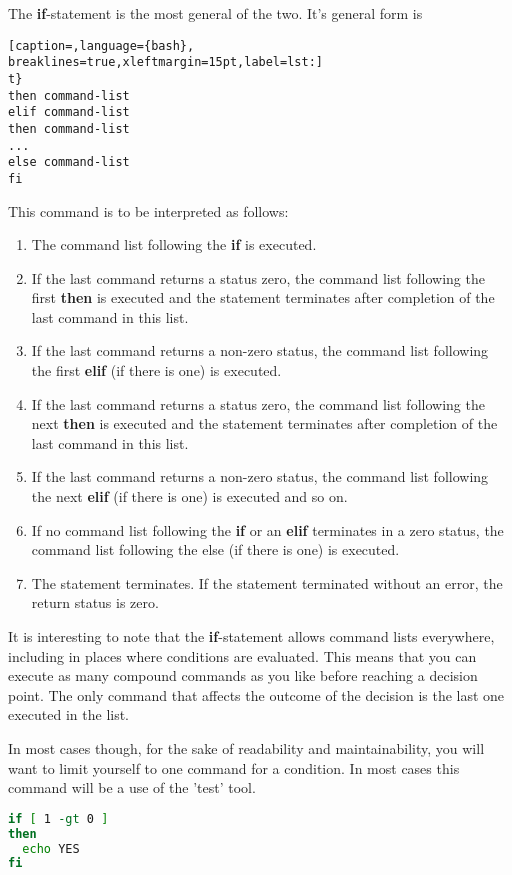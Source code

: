 The \textbf{if}-statement is the most general of the two. It's general form is
\lstset{basicstyle=\scriptsize, numbers=left, captionpos=b, tabsize=4}
\begin{lstlisting}[caption=,language={bash},
breaklines=true,xleftmargin=15pt,label=lst:]
t}
then command-list
elif command-list
then command-list
...
else command-list
fi
\end{lstlisting}

This command is to be interpreted as follows:

\begin{enumerate}
\setlength{\leftmargin}{0pt}
\setlength{\itemsep}{0pt}
\setlength{\parsep}{0pt}
\setlength{\parskip}{0pt}
	\item The command list following the \textbf{if} is executed.
	\item If the last command returns a status zero, the command list following
the first \textbf{then} is executed and the statement terminates after
completion of the last command in this list.
	\item If the last command returns a non-zero status, the command list
following the first \textbf{elif} (if there is one) is executed.
	\item If the last command returns a status zero, the command list following
the next \textbf{then} is executed and the statement terminates after
completion of the last command in this list.
	\item If the last command returns a non-zero status, the command list
following the next \textbf{elif} (if there is one) is executed and so on.
	\item If no command list following the \textbf{if} or an \textbf{elif}
terminates in a zero status, the command list following the else (if there is
one) is executed.
	\item The statement terminates. If the statement terminated without an
error, the return status is zero.
\end{enumerate}

It is interesting to note that the \textbf{if}-statement allows command lists
everywhere, including in places where conditions are evaluated. This means that
you can execute as many compound commands as you like before reaching a
decision point. The only command that affects the outcome of the decision is
the last one executed in the list.

In most cases though, for the sake of readability and maintainability, you will
want to limit yourself to one command for a condition. In most cases this
command will be a use of the 'test' tool.
\lstset{basicstyle=\scriptsize, numbers=left, captionpos=b, tabsize=4}
\begin{lstlisting}[caption=Example of a simple if statement,language={bash},
breaklines=true,xleftmargin=15pt,label=lst:Example of a simple if statement]
if [ 1 -gt 0 ]
then
  echo YES
fi
\end{lstlisting}

